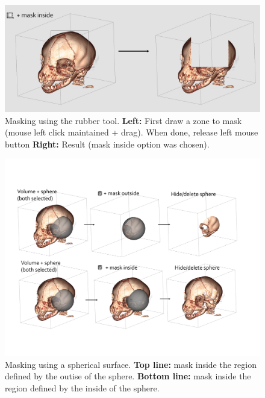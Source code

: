 \begin{figure}
  \centering
  \includegraphics[scale=0.25]{images/14/mask_example/mask_rubber.png}
\caption{Masking using the rubber tool.  \textbf{Left:} First draw a zone to mask (mouse left click maintained + drag). When done, release left mouse button \textbf{Right:} Result (mask inside option was chosen).}	 
\label{mask_rubber}
 \end{figure}


\begin{figure}
  \centering
  \includegraphics[scale=0.2]{images/14/mask_example/mask_sphere.png}
\caption{Masking using a spherical surface.  \textbf{Top line:} mask inside the region defined by the outise of the sphere. \textbf{Bottom line:} mask inside the region defined by the inside of the sphere.}	 
\label{mask_sphere}
 \end{figure}


